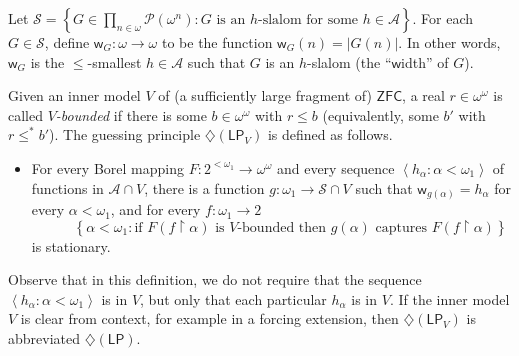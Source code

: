 \documentclass[11pt,leqno]{amsart}
\theoremstyle{definition}
\theoremstyle{remark}
\newcommand{\A}{\mathcal{A}}
\renewcommand{\P}{\mathcal{P}}
\newcommand{\explicitSet}[1]{\left\lbrace #1 \right\rbrace}
\newcommand{\brackets}[1]{\left\langle #1 \right\rangle}
\newcommand{\set}[2]{\explicitSet{#1 \colon #2}}
\newcommand{\seq}[2]{\brackets{#1 \colon #2}}
\newcommand{\<}{\langle}
\renewcommand{\>}{\rangle}
\renewcommand{\a}{\alpha}
\renewcommand{\b}{\beta}
\newcommand{\g}{\gamma}
\newcommand{\s}{\sigma}
\newcommand{\w}{\omega}
\newcommand{\0}{\emptyset}
\newcommand{\rest}{\!\restriction\!}
\newcommand{\1}{1\hspace{-1.75mm}1}
\newcommand{\zfc}{\ensuremath{\mathsf{ZFC}}\xspace}
\begin{document}

Let $\mathcal S = \set{G \in \prod_{n \in \w}\P(\w^n)}{G \text{ is an $h$-slalom for some }h \in \A}.$ 
For each $G \in \mathcal S$, define $\mathsf w_G : \w \to \w$ to be the function $\mathsf w_G(n) = |G(n)|$. In other words, $\mathsf w_G$ is the $\leq$-smallest $h \in \A$ such that $G$ is an $h$-slalom (the ``$\mathsf{w}$idth'' of $G$). 

Given an inner model $V$ of (a sufficiently large fragment of) \zfc, a real $r \in \w^\w$ is called \emph{$V$-bounded} if there is some $b \in \w^\w$ with $r \leq b$ (equivalently, some $b'$ with $r \leq^* b'$). 
The guessing principle $\diamondsuit(\mathsf{LP}_V)$ is defined as follows. 

\smallskip
\begin{itemize}
\item[$\diamondsuit(\mathsf{LP}_V):\hspace{-4.5mm}$]\hspace{4.5mm} 
For every Borel mapping $F: 2^{<\w_1} \to \w^\w$ and every sequence $\seq{h_\a}{\a < \w_1}$ of functions in $\A \cap V$, 
there is a function $g: \w_1 \to \mathcal S \cap V$ such that $\mathsf w_{g(\a)} = h_\a$ for every $\a < \w_1$, 
and for every $f: \w_1 \to 2$ 
$$\qquad \ \ \ \set{\a < \w_1}{\text{if $F(f \rest \a)$ is $V$-bounded then } g(\a) \text{ captures } F(f \rest \a)}$$
is stationary. 
\end{itemize}
\smallskip

Observe that in this definition, we do not require that the sequence $\seq{h_\a}{\a < \w_1}$ is in $V$, but only that each particular $h_\a$ is in $V$. 
If the inner model $V$ is clear from context, for example in a forcing extension, then $\diamondsuit(\mathsf{LP}_V)$ is abbreviated $\diamondsuit(\mathsf{LP})$. 
\end{document}
